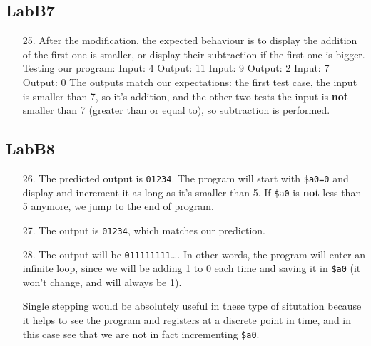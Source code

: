 \documentclass{article}
\begin{document}
\subsection{LabB7}
\begin{enumerate}
\item[25. ] After the modification, the expected behaviour is to display the addition of the first one is smaller, or display their subtraction if the first one is bigger. 
\newline
\newline
Testing our program:
\newline
\newline
Input: 4 \newline
Output: 11
\newline
\newline
Input: 9 \newline
Output: 2
\newline
\newline
Input: 7 \newline
Output: 0
\newline
\newline
The outputs match our expectations: the first test case, the input is smaller than 7, so it's addition, and the other two tests the input is \textbf{not} smaller than 7 (greater than or equal to), so subtraction is performed.
\end{enumerate}

\subsection{LabB8}
\begin{enumerate}

\item[26. ] The predicted output is \verb$01234$. The program will start with \verb#$a0=0# and display and increment it as long as it's smaller than 5. If \verb#$a0# is \textbf{not} less than 5 anymore, we jump to the end of program.

\item[27. ] The output is \verb$01234$, which matches our prediction.
\item[28. ] The output will be \verb$011111111$\ldots. In other words, the program will enter an infinite loop, since we will be adding 1 to 0 each time and saving it in \verb#$a0# (it won't change, and will always be 1).

Single stepping would be absolutely useful in these type of situtation because it helps to see the program and registers at a discrete point in time, and in this case see that we are not in fact incrementing \verb#$a0#.
\end{enumerate}
\end{document}

